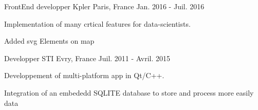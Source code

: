 \begin{cventries}
  \cventry
    {FrontEnd developper} %
    {Kpler} %
    {Paris, France} %
    {Jan. 2016 - Juil. 2016} %
    {
      \begin{cvitems} %
        \item {Implementation of many crtical features for  data-scientists.}
        \item {Added svg Elements on map}
      \end{cvitems}
    }

  \cventry
    {Developper} %
    {STI} %
    {Evry, France} %
    {Juil. 2011 - Avril. 2015} %
    {
      \begin{cvitems} %
        \item {Developpement of multi-platform app in Qt/C++.}
        \item {Integration of an embededd SQLITE database to store and process more easily data}
      \end{cvitems}
    }
\end{cventries}

